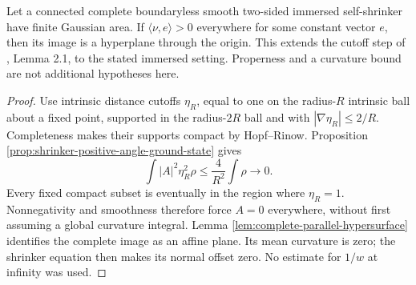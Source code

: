 \begin{theorem}\label{thm:shrinker-positive-angle-rigidity}
Let a connected complete boundaryless smooth two-sided immersed self-shrinker have finite Gaussian area. If $\langle\nu,e\rangle>0$ everywhere for some constant vector $e$, then its image is a hyperplane through the origin. This extends the cutoff step of \cite{Wang09}, Lemma 2.1, to the stated immersed setting. Properness and a curvature bound are not additional hypotheses here.
\end{theorem}
\begin{proof}
Use intrinsic distance cutoffs $\eta_R$, equal to one on the radius-$R$ intrinsic ball about a fixed point, supported in the radius-$2R$ ball and with $|\nabla\eta_R|\leq2/R$. Completeness makes their supports compact by Hopf--Rinow. Proposition \ref{prop:shrinker-positive-angle-ground-state} gives
\[
 \int|A|^2\eta_R^2\rho\leq\frac4{R^2}\int\rho\longrightarrow0.
\]
Every fixed compact subset is eventually in the region where $\eta_R=1$. Nonnegativity and smoothness therefore force $A=0$ everywhere, without first assuming a global curvature integral. Lemma \ref{lem:complete-parallel-hypersurface} identifies the complete image as an affine plane. Its mean curvature is zero; the shrinker equation then makes its normal offset zero. No estimate for $1/w$ at infinity was used.
\end{proof}

